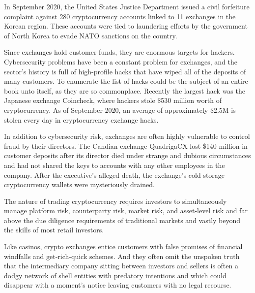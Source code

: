 
In September 2020, the United States Justice Department issued a civil
forfeiture complaint against 280 cryptocurrency accounts linked to 11 exchanges
in the Korean region. These accounts were tied to laundering efforts by the
government of North Korea to evade NATO sanctions on the country.


Since exchanges hold customer funds, they are enormous targets for hackers.
\cite{stecklow_chaos_2017} Cybersecurity problems have been a constant problem
for exchanges, and the sector's history is full of high-profile hacks that have
wiped all of the deposits of many customers. To enumerate the list of hacks
could be the subject of an entire book unto itself, as they are so commonplace.
Recently the largest hack was the Japanese exchange Coincheck, where hackers
stole \$530 million worth of cryptocurrency. As of September 2020, an average of
approximately \$2.5M is stolen every day in cryptocurrency exchange hacks.

In addition to cybersecurity risk, exchanges are often highly vulnerable to
control fraud by their directors. The Candian exchange QuadrigaCX lost \$140
million in customer deposits after its director died under strange and dubious
circumstances and had not shared the keys to accounts with any other employees
in the company. After the executive's alleged death, the exchange's cold storage
cryptocurrency wallets were mysteriously drained.


The nature of trading cryptocurrency requires investors to simultaneously manage
platform risk, counterparty risk, market risk, and asset-level risk and far
above the due diligence requirements of traditional markets and vastly beyond
the skills of most retail investors. \cite{roubini_great_2019}

Like casinos, crypto exchanges entice customers with false promises of financial
windfalls and get-rich-quick schemes. And they often omit the unspoken truth
that the intermediary company sitting between investors and sellers is often a
dodgy network of shell entities with predatory intentions and which could
disappear with a moment's notice leaving customers with no legal recourse.
